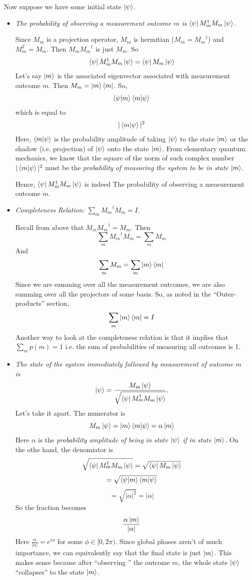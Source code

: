 \documentclass{article}
\begin{document}
Now suppose we have some initial state \(\ket{\psi}\).
\begin{itemize}
  \item \textit{The probability of observing a measurement outcome \(m\) is
  \(\bra{\psi}{M_m}^{\dagger}M_m\ket{\psi}\).}

  Since \(M_m\) is a projection
  operator, \(M_m\) is hermitian (\(M_m = {M_m}^{\dagger}\)) and \(M_m^2= M_m\).
  Then \(M_m{M_m}^{\dagger}\) is just \(M_m \). So
  \[\bra{\psi}{M_m}^{\dagger}M_m\ket{\psi} = \bra{\psi}M_m\ket{\psi}\]
  Let's say \(\ket{m}\) is the associated eigenvector associated with measurement
  outcome \(m\). Then \(M_m = \ket{m}\bra{m}\). So,
  \[\bra{\psi}\ket{m}\bra{m}\ket{\psi}\]
  which is equal to
  \[|\bra{m}\ket{\psi}|^2\]
  Here, \(\bra{m}\ket{\psi}\) is the probability amplitude of taking
  \(\ket{\psi}\) to the state \(\ket{m}\) or the shadow (i.e. projection) of
  \(\ket{\psi}\) onto the state \(\ket{m}\). From elementary quantum mechanics,
  we know that the square of the norm of such complex number \(|\bra{m}\ket{\psi}|^2\)
  must be the \textit{probability of measuring the system to be in state
  \(\ket{m}\)}.

  Hence, \(\bra{\psi}{M_m}^{\dagger}M_m\ket{\psi}\) is indeed The probability
  of observing a measurement outcome \(m\).

  \item \textit{Completeness Relation: \(\sum_m {M_m}^{\dagger}M_m = I\).}

  Recall from above that \(M_m{M_m}^{\dagger}= M_m \). Then
  \[\sum_m {M_m}^{\dagger}M_m = \sum_m M_m  \]
  And
  \[\sum_m M_m = \sum_m \ket{m}\bra{m}\]
  Since we are summing over all the measurement outcomes, we are also
  summing over all the projectors of some basis. So, as noted in
  the ``Outer-products'' section,
   \[\sum_m \ket{m}\bra{m} = I\]
  Another way to look at the completeness relation is that it implies that
  \(\sum_m p(m) = 1\) i.e. the sum of probabilities of measuring
  all outcomes is 1.


  \item \textit{The state of the system immediately followed by measurement of
  outcome \(m\) is
  \[\ket{\psi} = \frac{M_m \ket{\psi}}
  {\sqrt{\bra{\psi}{M_m}^{\dagger}M_m\ket{\psi}}}.\]}
  Let's take it apart. The numerator is
  \[M_m \ket{\psi} = \ket{m}\bra{m}\ket{\psi} = \alpha\ket{m}\]
  Here \(\alpha\) is the \textit{probability amplitude of being in state
  \(\ket{\psi}\) if in state \(\ket{m}\).}
  On the othe hand, the denomiator is
  \[\sqrt{\bra{\psi}{M_m}^{\dagger}M_m\ket{\psi}} =
  \sqrt{\bra{\psi}M_m\ket{\psi}}\]
  \[= \sqrt{\bra{\psi}\ket{m}\bra{m}\ket{\psi}}\]
  \[= \sqrt{|\alpha|^2} = |\alpha|\]
  So the fraction becomes
  \[\frac{\alpha\ket{m}}{|\alpha|}\]
  Here \(\frac{\alpha}{|\alpha|} = e^{i\phi}\) for some \(\phi \in [0,2\pi)\).
  Since global phases aren't of much importance, we can equivalently say
  that the final state is just \(\ket{m}\). This makes sense because
  after ``observing '' the outcome \(m\), the whole state \(\ket{\psi}\)
  ``collapses'' to the state \(\ket{m}\).

\end{itemize}
\end{document}
